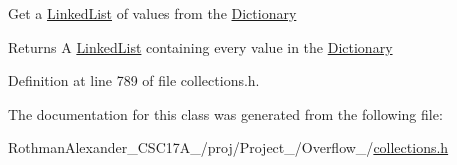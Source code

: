 Get a \hyperlink{class_collections_1_1_linked_list}{Linked\+List} of values from the \hyperlink{class_collections_1_1_dictionary}{Dictionary} \begin{DoxyReturn}{Returns}
A \hyperlink{class_collections_1_1_linked_list}{Linked\+List} containing every value in the \hyperlink{class_collections_1_1_dictionary}{Dictionary} 
\end{DoxyReturn}


Definition at line 789 of file collections.\+h.



The documentation for this class was generated from the following file\+:\begin{DoxyCompactItemize}
\item 
Rothman\+Alexander\+\_\+\+C\+S\+C17\+A\+\_/proj/\+Project\+\_/\+Overflow\+\_/\hyperlink{collections_8h}{collections.\+h}\end{DoxyCompactItemize}
